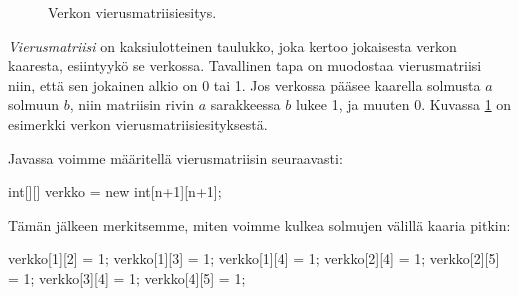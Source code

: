 \begin{figure}
\center
\begin{center}
\end{center}
\caption{Verkon vierusmatriisiesitys.}
\label{fig:vervim}
\end{figure}

\emph{Vierusmatriisi} on kaksiulotteinen taulukko,
joka kertoo jokaisesta verkon kaaresta,
esiintyykö se verkossa.
Tavallinen tapa on muodostaa vierusmatriisi niin,
että sen jokainen alkio on 0 tai 1.
Jos verkossa pääsee kaarella solmusta
$a$ solmuun $b$,
niin matriisin rivin $a$ sarakkeessa $b$
lukee 1, ja muuten 0.
Kuvassa \ref{fig:vervim} on esimerkki
verkon vierusmatriisiesityksestä.

Javassa voimme määritellä vierusmatriisin seuraavasti:

\begin{code}
int[][] verkko = new int[n+1][n+1];
\end{code}

Tämän jälkeen merkitsemme, miten voimme kulkea
solmujen välillä kaaria pitkin:

\begin{code}
verkko[1][2] = 1;
verkko[1][3] = 1;
verkko[1][4] = 1;
verkko[2][4] = 1;
verkko[2][5] = 1;
verkko[3][4] = 1;
verkko[4][5] = 1;
\end{code}

